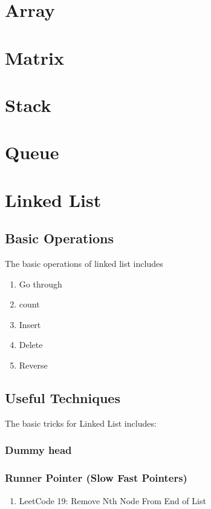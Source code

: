 \chapter{ Array }

\chapter{ Matrix }

\chapter{ Stack }

\chapter{ Queue }

\chapter{ Linked List }

\section{ Basic Operations  }
The basic operations of linked list includes
\begin{enumerate}
    \item Go through

    \item count

    \item Insert

    \item Delete

    \item Reverse

\end{enumerate}

\section{ Useful Techniques  }
The basic tricks for Linked List includes:

\subsection { Dummy head }


\subsection { Runner Pointer (Slow Fast Pointers)}
\begin{enumerate}
    \item LeetCode 19: Remove Nth Node From End of List


\end{enumerate}

